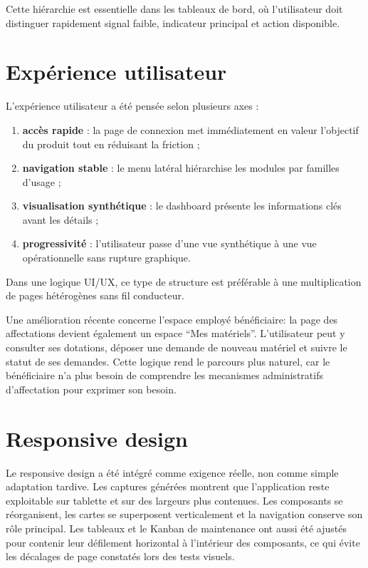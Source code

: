 ﻿\documentclass[12pt,a4paper,oneside]{report}
\begin{document}
Cette hiérarchie est essentielle dans les tableaux de bord, où l'utilisateur doit distinguer rapidement signal faible, indicateur principal et action disponible.

\section{Expérience utilisateur}
L'expérience utilisateur a été pensée selon plusieurs axes :
\begin{enumerate}
  \item \textbf{accès rapide} : la page de connexion met immédiatement en valeur l'objectif du produit tout en réduisant la friction ;
  \item \textbf{navigation stable} : le menu latéral hiérarchise les modules par familles d'usage ;
  \item \textbf{visualisation synthétique} : le dashboard présente les informations clés avant les détails ;
  \item \textbf{progressivité} : l'utilisateur passe d'une vue synthétique à une vue opérationnelle sans rupture graphique.
\end{enumerate}

Dans une logique UI/UX, ce type de structure est préférable à une multiplication de pages hétérogènes sans fil conducteur.

Une amélioration récente concerne l'espace employé bénéficiaire: la page des affectations devient également un espace \enquote{Mes matériels}. L'utilisateur peut y consulter ses dotations, déposer une demande de nouveau matériel et suivre le statut de ses demandes. Cette logique rend le parcours plus naturel, car le bénéficiaire n'a plus besoin de comprendre les mecanismes administratifs d'affectation pour exprimer son besoin.

\section{Responsive design}
Le responsive design a été intégré comme exigence réelle, non comme simple adaptation tardive. Les captures générées montrent que l'application reste exploitable sur tablette et sur des largeurs plus contenues. Les composants se réorganisent, les cartes se superposent verticalement et la navigation conserve son rôle principal. Les tableaux et le Kanban de maintenance ont aussi été ajustés pour contenir leur défilement horizontal à l'intérieur des composants, ce qui évite les décalages de page constatés lors des tests visuels.
\end{document}
